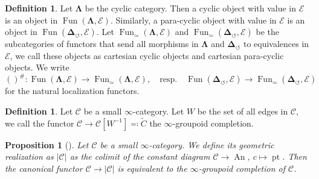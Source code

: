 \documentclass[11pt]{amsart}
\numberwithin{equation}{section}
\theoremstyle{plain}
\newtheorem{Prop}[prop]{Proposition}
\theoremstyle{definition}
\newtheorem{Def}[def]{Definition}
\theoremstyle{remark}
\newcommand{\cC} { {\mathcal{C}}}
\newcommand{\cE} { {\mathcal{E}}}
\newcommand{\pt}{{\operatorname{pt}}}
\newcommand\Fun{\operatorname{Fun}}
\newcommand\An{ {\operatorname{An} } }
\begin{document}
\begin{Def}
    Let $\boldsymbol{\Lambda}$ be the cyclic category. Then a cyclic object with value in $\cE$ is an object in $\Fun(\boldsymbol{\Lambda}, \cE)$. Similarly, a para-cyclic object with value in $\cE$ is an object in $\Fun(\boldsymbol{\Delta}_\circlearrowleft, \cE)$. Let $\Fun_\simeq (\boldsymbol{\Lambda}, \cE)$ and $\Fun_\simeq(\boldsymbol{\Delta}_\circlearrowleft, \cE)$ be the subcategories of functors that send all morphisms in $\boldsymbol{\Lambda}$ and $\boldsymbol{\Delta}_\circlearrowleft$ to equivalences in $\cE$, we call these objects as cartesian cyclic objects and cartesian para-cyclic objects.
    We write 
    \[()^\#: \Fun (\boldsymbol{\Lambda}, \cE) \to \Fun_\simeq (\boldsymbol{\Lambda}, \cE), \quad \text{resp.} \quad \Fun (\boldsymbol{\Delta}_\circlearrowleft, \cE) \to \Fun_\simeq(\boldsymbol{\Delta}_\circlearrowleft, \cE)\]
    for the natural localization functors.
\end{Def}


\begin{Def}Let $\cC$ be a small $\infty$-category. Let $W$ be the set of all edges in $\cC$, we call the functor $\cC\to  \cC[W^{-1}]\eqqcolon \widetilde{C}$ the $\infty$-groupoid completion.
\end{Def}
\begin{Prop}[{\cite[Proposition 6.3.1.21]{kerodon}}]\label{prop: groupoid completion}Let $\cC$ be a small $\infty$-category. We define its geometric realization as $|\cC|$ as the colimit of the constant diagram $\cC\to \An$, $c\mapsto \pt$. Then the canonical functor $\cC\to |\cC|$ is equivalent to the $\infty$-groupoid completion of $\cC$.
\end{Prop}
\end{document}
